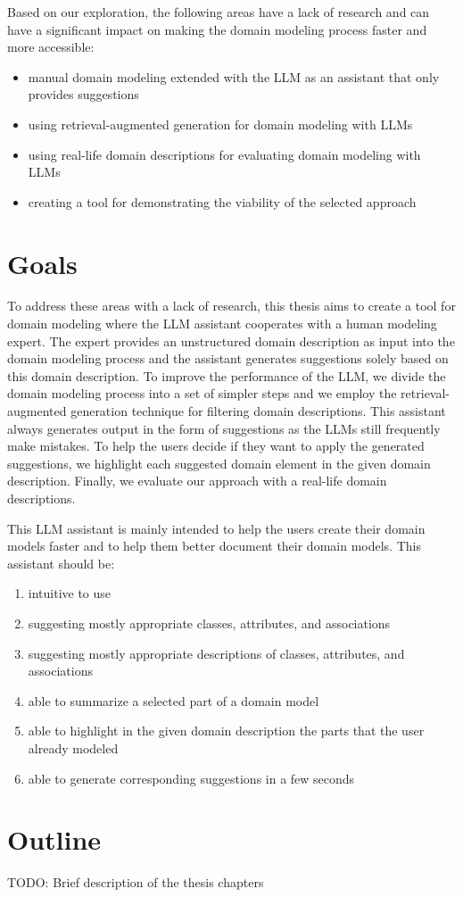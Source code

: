 Based on our exploration, the following areas have a lack of research and can have a significant impact on making the domain modeling process faster and more accessible:

\begin{itemize}
\item manual domain modeling extended with the LLM as an assistant that only provides suggestions
\item using retrieval-augmented generation for domain modeling with LLMs
\item using real-life domain descriptions for evaluating domain modeling with LLMs
\item creating a tool for demonstrating the viability of the selected approach
\end{itemize}


\section*{Goals}

To address these areas with a lack of research, this thesis aims to create a tool for domain modeling where the LLM assistant cooperates with a human modeling expert. The expert provides an unstructured domain description as input into the domain modeling process and the assistant generates suggestions solely based on this domain description. To improve the performance of the LLM, we divide the domain modeling process into a set of simpler steps and we employ the retrieval-augmented generation technique for filtering domain descriptions. This assistant always generates output in the form of suggestions as the LLMs still frequently make mistakes. To help the users decide if they want to apply the generated suggestions, we highlight each suggested domain element in the given domain description. Finally, we evaluate our approach with a real-life domain descriptions.

This LLM assistant is mainly intended to help the users create their domain models faster and to help them better document their domain models. This assistant should be:

\begin{enumerate}
\item intuitive to use
\item suggesting mostly appropriate classes, attributes, and associations
\item suggesting mostly appropriate descriptions of classes, attributes, and associations
\item able to summarize a selected part of a domain model
\item able to highlight in the given domain description the parts that the user already modeled
\item able to generate corresponding suggestions in a few seconds
\end{enumerate}


\section*{Outline}

\noindent{}TODO: Brief description of the thesis chapters
